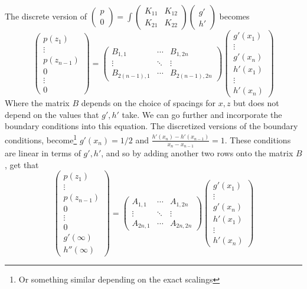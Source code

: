 \documentclass{article}
\begin{document}
The discrete version of 
$\displaystyle \left( \begin{array}{c} p \\ 0 \end{array} \right) =
\int \left(
\begin{array}{cc} K_{11} & K_{12} \\ K_{21} & K_{22} \end{array}
\right)
 \left( \begin{array}{c} g' \\ h' \end{array} \right) $
becomes
\[ \left( \begin{array}{c} p(z_1) \\ \vdots \\ p(z_{n-1}) \\[4pt] 0 \\ \vdots \\
0 \end{array} \right) =
\left( \begin{array}{ccc} B_{1,1} & \cdots & B_{1 , 2n} \\
\vdots & \ddots & \vdots \\ B_{2(n-1),1} & \cdots & B_{2(n-1) , 2n} 
\end{array}
\right)
 \left( \begin{array}{c} g'(x_1) \\ \vdots \\ g'(x_n) \\[4pt] h'(x_1) \\ \vdots
\\ h'(x_n) \end{array} \right) \]
Where the matrix $B$ depends on the choice of spacings for $x, z$ but does
not depend on the values that $g', h'$ take.
We can go further and incorporate the boundary conditions into this equation. 
The discretized versions of the boundary conditions, become\footnote{Or
something similar depending on the exact scalings} 
$g'(x_n)=1/2$ and $\frac{h'(x_n)-h'(x_{n-1})}{x_n-x_{n-1}} = 1$. These conditions
are linear in terms of $g',h'$, and so by adding another two rows onto the matrix
$B$, get that
\[ \left( \begin{array}{c} p(z_1) \\ \vdots \\ p(z_{n-1}) \\[4pt] 0 \\ \vdots \\
0 \\ g'(\infty) \\ h''(\infty) \end{array} \right) =
\left( \begin{array}{ccc} A_{1,1} & \cdots & A_{1 , 2n} \\
\vdots & \ddots & \vdots \\ A_{2n,1} & \cdots & A_{2n , 2n} 
\end{array}
\right)
 \left( \begin{array}{c} g'(x_1) \\ \vdots \\ g'(x_n) \\[4pt] h'(x_1) \\ \vdots
\\ h'(x_n) \end{array} \right) \]
\end{document}
